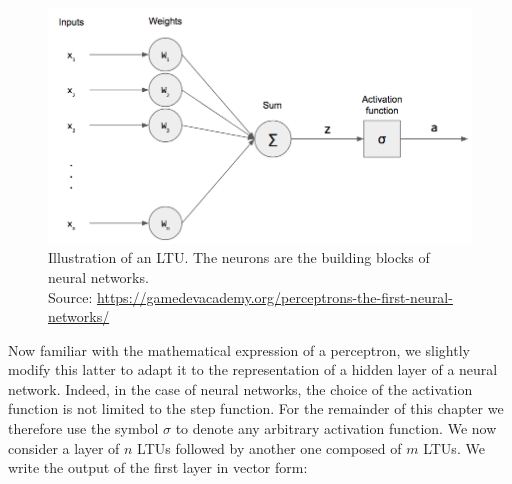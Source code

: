 

\begin{figure}[ht]
    \centering
    \includegraphics[width=\textwidth]{imgs/Single-Perceptron.png}
    \caption{Illustration of an LTU. The neurons are the building blocks of neural networks. 
    \\ Source: \url{https://gamedevacademy.org/perceptrons-the-first-neural-networks/}}
    \label{fig:perceptron}
\end{figure}

\par Now familiar with the mathematical expression of a perceptron, we slightly modify this latter to adapt it to the representation of a hidden layer of a neural network. Indeed, in the case of neural networks, the choice of the activation function is not limited to the step function. For the remainder of this chapter we therefore use the symbol $\sigma$ to denote any arbitrary activation function. We now consider a layer of $n$ LTUs followed by another one composed of $m$ LTUs. We write the output of the first layer in vector form:

